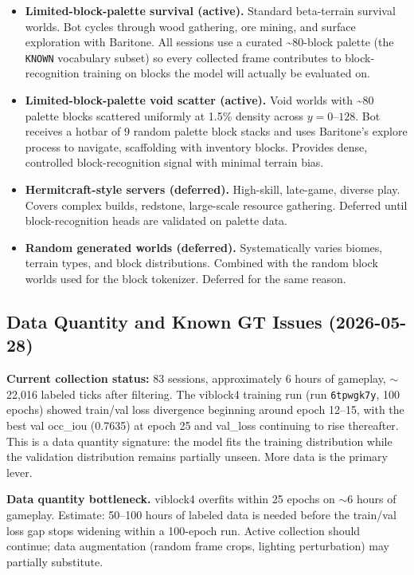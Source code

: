 \documentclass[11pt,a4paper]{article}
\begin{document}
\begin{itemize}
  \item \textbf{Limited-block-palette survival (active).} Standard beta-terrain survival worlds. Bot cycles through wood gathering, ore mining, and surface exploration with Baritone. All sessions use a curated \textasciitilde{}80-block palette (the \texttt{KNOWN} vocabulary subset) so every collected frame contributes to block-recognition training on blocks the model will actually be evaluated on.

  \item \textbf{Limited-block-palette void scatter (active).} Void worlds with \textasciitilde{}80 palette blocks scattered uniformly at 1.5\% density across $y=0$--$128$. Bot receives a hotbar of 9 random palette block stacks and uses Baritone's explore process to navigate, scaffolding with inventory blocks. Provides dense, controlled block-recognition signal with minimal terrain bias.

  \item \textbf{Hermitcraft-style servers (deferred).} High-skill, late-game, diverse play. Covers complex builds, redstone, large-scale resource gathering. Deferred until block-recognition heads are validated on palette data.

  \item \textbf{Random generated worlds (deferred).} Systematically varies biomes, terrain types, and block distributions. Combined with the random block worlds used for the block tokenizer. Deferred for the same reason.
\end{itemize}

\subsection{Data Quantity and Known GT Issues (2026-05-28)}
\label{sec:data-issues}

\textbf{Current collection status:} 83 sessions, approximately 6 hours of gameplay, $\sim$22{,}016 labeled ticks after filtering. The viblock4 training run (run \texttt{6tpwgk7y}, 100 epochs) showed train/val loss divergence beginning around epoch 12--15, with the best val occ\_iou (0.7635) at epoch 25 and val\_loss continuing to rise thereafter. This is a data quantity signature: the model fits the training distribution while the validation distribution remains partially unseen. More data is the primary lever.

\begin{openquestion}
\textbf{Data quantity bottleneck.} viblock4 overfits within 25 epochs on $\sim$6 hours of gameplay. Estimate: 50--100 hours of labeled data is needed before the train/val loss gap stops widening within a 100-epoch run. Active collection should continue; data augmentation (random frame crops, lighting perturbation) may partially substitute.
\end{openquestion}
\end{document}
